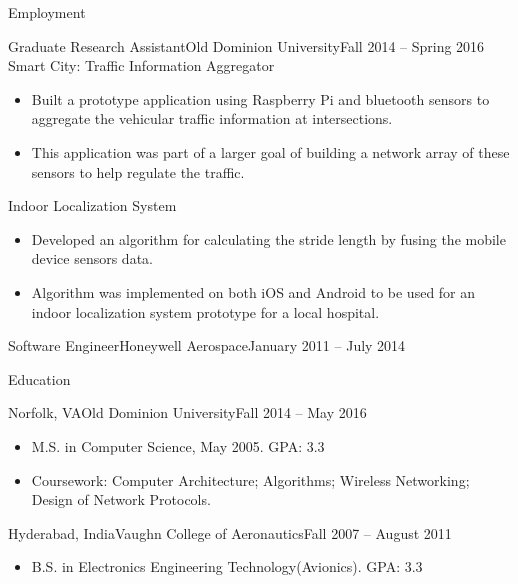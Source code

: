 \documentclass{mcdowellcv}
\begin{document}
\begin{cvsection}{Employment}
		\begin{cvsubsection}{Graduate Research Assistant}{Old Dominion University}{Fall 2014 -- Spring 2016}
			Smart City: Traffic Information Aggregator
			\begin{itemize}
				\item Built a prototype application using Raspberry Pi and bluetooth sensors to aggregate the vehicular traffic information at intersections.
				\item This application was part of a larger goal of building a network array of these sensors to help regulate the traffic.
			\end{itemize}
			Indoor Localization System
			\begin{itemize}
				\item Developed an algorithm for calculating the stride length by fusing the mobile device sensors data.
				\item Algorithm was implemented on both iOS and Android to be used for an indoor localization system prototype for a local hospital.
			\end{itemize}
		\end{cvsubsection}
		
		\begin{cvsubsection}{Software Engineer}{Honeywell Aerospace}{January 2011 -- July 2014}
		\end{cvsubsection}
	\end{cvsection}
	
	\begin{cvsection}{Education}
		\begin{cvsubsection}{Norfolk, VA}{Old Dominion University}{Fall 2014 -- May 2016}
			\begin{itemize}
				\item M.S. in Computer Science, May 2005. GPA: 3.3
				\item Coursework: Computer Architecture; Algorithms; Wireless Networking; Design of Network Protocols.
			\end{itemize}
		\end{cvsubsection}
		\begin{cvsubsection}{Hyderabad, India}{Vaughn College of Aeronautics}{Fall 2007 -- August 2011}
			\begin{itemize}
				\item B.S. in Electronics Engineering Technology(Avionics). GPA: 3.3
			\end{itemize}
		\end{cvsubsection}
	\end{cvsection}
	
\end{document}
